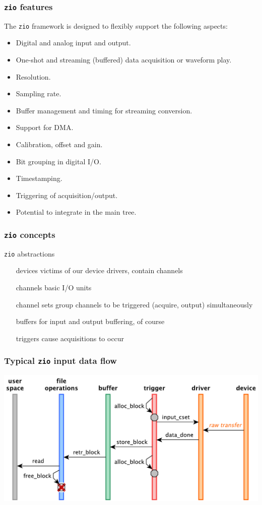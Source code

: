 \documentclass[compress,red]{beamer}
\begin{document}
\begin{frame}
\frametitle{\texttt{zio} features}

The \texttt{zio} framework is designed to flexibly support the following
aspects:
\begin{itemize}
\item Digital and analog input and output.
\item One-shot and streaming (buffered) data acquisition or waveform play.
\item Resolution.
\item Sampling rate.
\item Buffer management and timing for streaming conversion.
\item Support for DMA.
\item Calibration, offset and gain.
\item Bit grouping in digital I/O.
\item Timestamping.
\item Triggering of acquisition/output.
\item Potential to integrate in the main tree.
\end{itemize}

\end{frame}

\begin{frame}
\frametitle{\texttt{zio} concepts}

\begin{block}{\texttt{zio} abstractions}
\begin{itemize}
\item[devices] victims of our device drivers, contain channels
\item[channels] basic I/O units
\item[channel sets] group channels to be triggered (acquire, output)
	simultaneously
\item[buffers] for input and output buffering, of course
\item[triggers] cause acquisitions to occur
\end{itemize}
\end{block}

\end{frame}

\begin{frame}
\frametitle{Typical \texttt{zio} input data flow}
\includegraphics[height=0.8\textheight]{flow-temp-in.pdf}
\end{frame}
\end{document}
